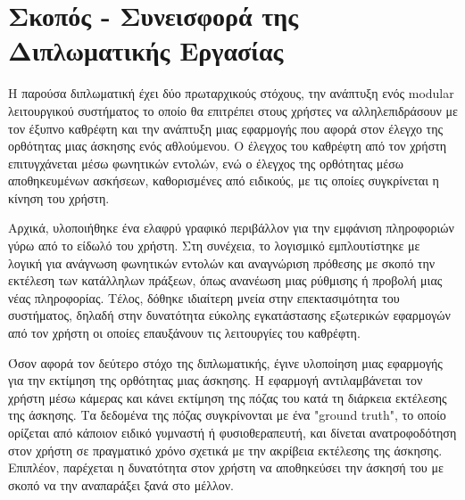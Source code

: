 \section{Σκοπός - Συνεισφορά της Διπλωματικής Εργασίας}
\label{section:contribution}

Η παρούσα διπλωματική έχει δύο πρωταρχικούς στόχους, την ανάπτυξη ενός modular λειτουργικού συστήματος το οποίο θα επιτρέπει στους χρήστες να αλληλεπιδράσουν με τον έξυπνο καθρέφτη και την ανάπτυξη μιας εφαρμογής που αφορά στον έλεγχο της ορθότητας μιας άσκησης ενός αθλούμενου. Ο έλεγχος του καθρέφτη από τον χρήστη επιτυγχάνεται μέσω φωνητικών εντολών, ενώ ο έλεγχος της ορθότητας μέσω αποθηκευμένων ασκήσεων, καθορισμένες από ειδικούς, με τις οποίες συγκρίνεται η κίνηση του χρήστη.

Αρχικά, υλοποιήθηκε ένα ελαφρύ γραφικό περιβάλλον για την εμφάνιση πληροφοριών γύρω από το είδωλό του χρήστη. Στη συνέχεια, το λογισμικό εμπλουτίστηκε με λογική για ανάγνωση φωνητικών εντολών και αναγνώριση πρόθεσης με σκοπό την εκτέλεση των κατάλληλων πράξεων, όπως ανανέωση μιας ρύθμισης ή προβολή μιας νέας πληροφορίας. Τέλος, δόθηκε ιδιαίτερη μνεία στην επεκτασιμότητα του συστήματος, δηλαδή στην δυνατότητα εύκολης εγκατάστασης εξωτερικών εφαρμογών από τον χρήστη οι οποίες επαυξάνουν τις λειτουργίες του καθρέφτη.

Όσον αφορά τον δεύτερο στόχο της διπλωματικής, έγινε υλοποίηση μιας εφαρμογής για την εκτίμηση της ορθότητας μιας άσκησης. Η εφαρμογή αντιλαμβάνεται τον χρήστη μέσω κάμερας και κάνει εκτίμηση της πόζας του κατά τη διάρκεια εκτέλεσης της άσκησης. Τα δεδομένα της πόζας συγκρίνονται με ένα "ground truth", το οποίο ορίζεται από κάποιον ειδικό γυμναστή ή φυσιοθεραπευτή, και δίνεται ανατροφοδότηση στον χρήστη σε πραγματικό χρόνο σχετικά με την ακρίβεια εκτέλεσης της άσκησης. Επιπλέον, παρέχεται η δυνατότητα στον χρήστη να αποθηκεύσει την άσκησή του με σκοπό να την αναπαράξει ξανά στο μέλλον.


%
%
